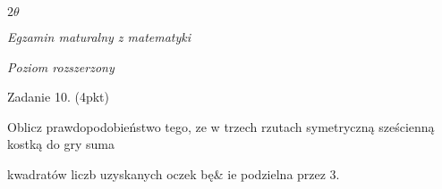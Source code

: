 \documentclass[a4paper,12pt]{article}
\begin{document}
$ 2\theta$

{\it Egzamin maturalny z matematyki}

{\it Poziom rozszerzony}

Zadanie 10. (4pkt)

Oblicz prawdopodobieństwo tego, ze w trzech rzutach symetryczną sześcienną kostką do gry suma

kwadratów liczb uzyskanych oczek bę\& ie podzielna przez 3.
\end{document}
